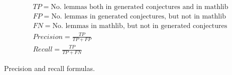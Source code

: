 \begin{equationset}[H]
\begin{gather}
  TP = \text{No. lemmas both in generated conjectures and in mathlib} \nonumber \\
  FP = \text{No. lemmas in generated conjectures, but not in mathlib} \nonumber \\
  FN = \text{No. lemmas in mathlib, but not in generated conjectures} \nonumber \\
  Precision = \frac{TP}{TP + FP} \nonumber \\
  Recall = \frac{TP}{TP + FN} \nonumber
\end{gather}
\caption{Precision and recall formulas.}\label{eqs:precisionandrecall}
\end{equationset}




